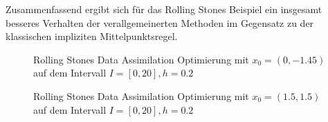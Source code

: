 Zusammenfassend ergibt sich für das Rolling Stones Beispiel ein insgesamt besseres Verhalten der verallgemeinerten Methoden im Gegensatz zu der klassischen impliziten Mittelpunktsregel.
\begin{figure}[H]
\footnotesize
\centering
\begin{minipage}[b]{0.49\linewidth}

\end{minipage}
\begin{minipage}[b]{0.49\linewidth}

\end{minipage}
\caption{Rolling Stones Data Assimilation Optimierung mit $x_0=(0,-1.45)$ auf dem Intervall $I = [0,20], h=0.2$}
\label{fig:rollingStonesOpt2}
\end{figure}

\begin{figure}[H]
\footnotesize 
\centering
\begin{minipage}[b]{0.49\linewidth}

\end{minipage}
\begin{minipage}[b]{0.49\linewidth}

\end{minipage}
\caption{Rolling Stones Data Assimilation Optimierung mit $x_0=(1.5,1.5)$ auf dem Intervall $I = [0,20], h=0.2$}
\label{fig:rollingStonesOpt1}
\end{figure}


